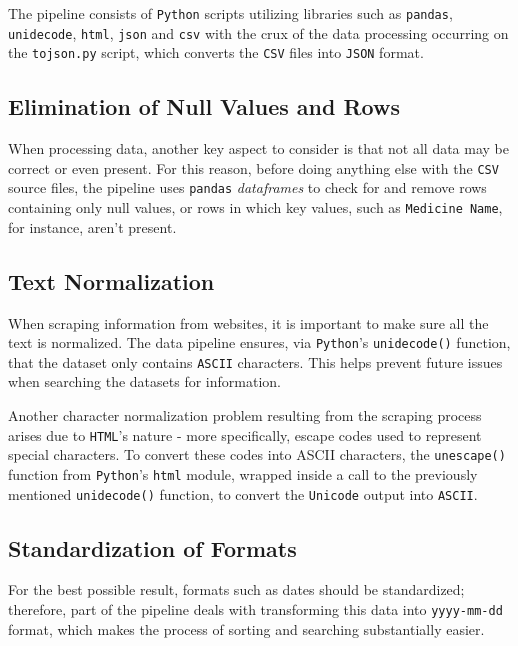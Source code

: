 \documentclass[sigconf]{acmart}
\begin{document}
The pipeline consists of \texttt{Python}\cite{python} scripts utilizing libraries such as \texttt{pandas}\cite{pandas}, \texttt{unidecode}\cite{unidecode}, \texttt{html}\cite{html}, \texttt{json}\cite{json} and \texttt{csv}\cite{csv} with the crux of the data processing occurring on the \texttt{to{\textunderscore}json.py} script, which converts the \texttt{CSV} files into \texttt{JSON} format.

\subsection{Elimination of Null Values and Rows}

When processing data, another key aspect to consider is that not all data may be correct or even present. For this reason, before doing anything else with the \texttt{CSV} source files, the pipeline uses \texttt{pandas} \textit{dataframes} to check for and remove rows containing only null values, or rows in which key values, such as \texttt{Medicine Name}, for instance, aren't present.

\subsection{Text Normalization}

When scraping information from websites, it is important to make sure all the text is normalized. The data pipeline ensures, via \texttt{Python}'s \texttt{unidecode()} function, that the dataset only contains \texttt{ASCII} characters. This helps prevent future issues when searching the datasets for information.

Another character normalization problem resulting from the scraping process arises due to \texttt{HTML}'s nature - more specifically, escape codes used to represent special characters. To convert these codes into ASCII characters, the \texttt{unescape()}\cite{html} function from \texttt{Python}'s \texttt{html} module, wrapped inside a call to the previously mentioned \texttt{unidecode()} function, to convert the \texttt{Unicode} output into \texttt{ASCII}.

\subsection{Standardization of Formats}

For the best possible result, formats such as dates should be standardized; therefore, part of the pipeline deals with transforming this data into \texttt{yyyy-mm-dd} format, which makes the process of sorting and searching substantially easier. 
\end{document}
